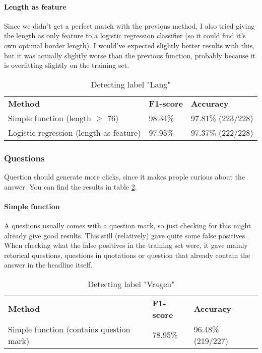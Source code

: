 \documentclass{article}
\begin{document}
\paragraph{Length as feature} Since we didn't get a perfect match with the previous method, I also tried giving the length as only feature to a logistic regression classifier (so it could find it's own optimal border length). I would've expected slightly better results with this, but it was actually slightly worse than the previous function, probably because it is overfitting slightly on the training set.


\begin{table}[]
\begin{tabular}{lll}
\textbf{Method}                          & \textbf{F1-score} & \textbf{Accuracy} \\
Simple function (length $\geq$ 76) & 98.34\%           & 97.81\% (223/228) \\
Logistic regression (length as feature)      & 97.95\%           & 97.37\% (222/228)
\end{tabular}
\caption{Detecting label "Lang"}
\label{tab:length}
\end{table}

\subsubsection{Questions}
Question should generate more clicks, since it makes people curious about the answer. \cite{soubry} You can find the results in table \ref{tab:questions}.

\paragraph{Simple function} A questions usually comes with a question mark, so just checking for this might already give good results. This still (relatively) gave quite some false positives. When checking what the false positives in the training set were, it gave mainly retorical questions, questions in quotations or question that already contain the answer in the headline itself.

\begin{table}[]
\begin{tabular}{lll}
\textbf{Method}                          & \textbf{F1-score} & \textbf{Accuracy} \\
Simple function (contains question mark) & 78.95\%           & 96.48\% (219/227)
\end{tabular}
\caption{Detecting label "Vragen"}
\label{tab:questions}
\end{table}
\end{document}
